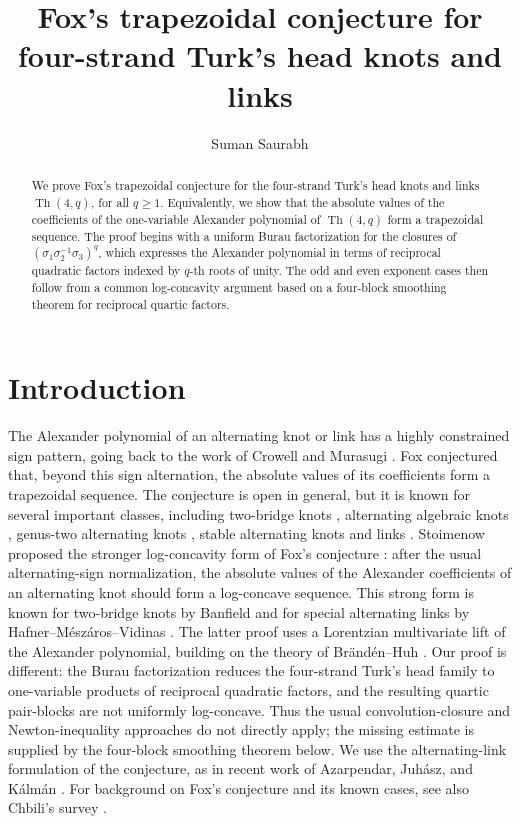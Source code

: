 \documentclass[11pt]{amsart}
\title[Fox's conjecture for $\Th(4,q)$]
{Fox's trapezoidal conjecture for four-strand Turk's head knots and links}
\author{Suman Saurabh}
\newcommand{\Th}{\operatorname{Th}}
\begin{document}
\begin{abstract}
We prove Fox's trapezoidal conjecture for the four-strand Turk's head knots and links $\Th(4,q)$, for all $q\geq 1$.  Equivalently, we show that the absolute values of the coefficients of the one-variable Alexander polynomial of $\Th(4,q)$ form a trapezoidal sequence.  The proof begins with a uniform Burau factorization for the closures of $(\sigma_1\sigma_2^{-1}\sigma_3)^q$, which expresses the Alexander polynomial in terms of reciprocal quadratic factors indexed by \(q\)-th roots of unity.  The odd and even exponent cases then follow from a common log-concavity argument based on a four-block smoothing theorem for reciprocal quartic factors.

\end{abstract}

\maketitle

\section{Introduction}

The Alexander polynomial of an alternating knot or link has a highly constrained sign pattern, going back to the work of Crowell and Murasugi \cite{crowell,murasugi}.  Fox \cite{fox} conjectured that, beyond this sign alternation, the absolute values of its coefficients form a trapezoidal sequence.  The conjecture is open in general, but it is known for several important classes, including two-bridge knots \cite{hartley}, alternating algebraic knots \cite{murasugi-algebraic}, genus-two alternating knots \cite{ozsvath-szabo,jong1,jong2}, stable alternating knots and links \cite{hirasawa-murasugi}. Stoimenow proposed the stronger log-concavity form of Fox's
conjecture \cite{stoimenow-newton}: after the usual alternating-sign
normalization, the absolute values of the Alexander coefficients of an
alternating knot should form a log-concave sequence.  This strong form
is known for two-bridge knots by Banfield \cite{banfield} and for
special alternating links by Hafner--Mészáros--Vidinas
\cite{hafner-meszaros-vidinas}.  The latter proof uses a Lorentzian
multivariate lift of the Alexander polynomial, building on the theory
of Brändén--Huh \cite{branden-huh}.  Our proof is different: the
Burau factorization reduces the four-strand Turk's head family to
one-variable products of reciprocal quadratic factors, and the
resulting quartic pair-blocks are not uniformly log-concave.  Thus the
usual convolution-closure and Newton-inequality approaches do not
directly apply; the missing estimate is supplied by the four-block smoothing theorem below. We use the alternating-link formulation of the conjecture, as in recent work of Azarpendar, Juh\'asz, and K\'alm\'an \cite{azarpendar-juhasz-kalman}.  For background on Fox's conjecture and its known cases, see also Chbili's survey \cite{chbili-survey}.
\end{document}
